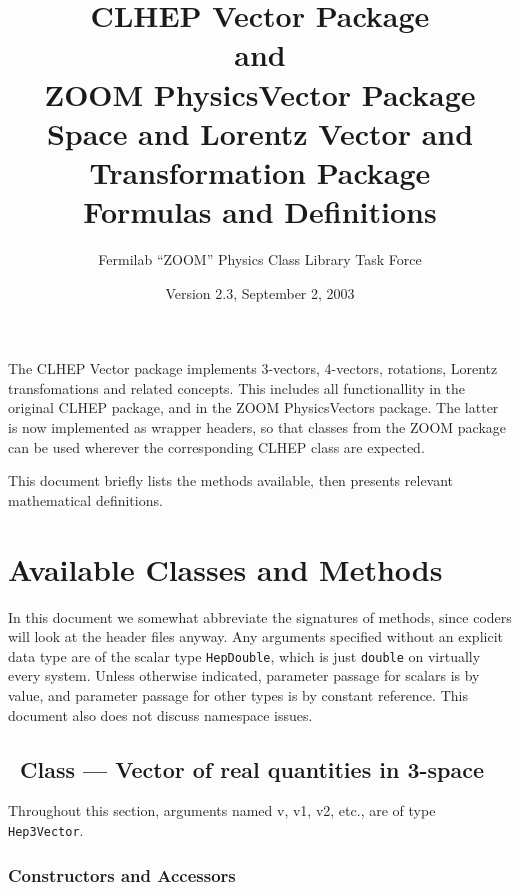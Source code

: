 \documentclass[twoside,12pt]{article}
\def \SV {{\tt Hep3Vector}}
\begin{document}
\title{CLHEP {\bf Vector} Package \\ 
and \\
ZOOM {\bf PhysicsVector} Package \\
Space and Lorentz Vector and Transformation Package \\
Formulas and Definitions}

\author{
Fermilab ``ZOOM'' Physics Class Library Task Force}
\date{Version 2.3, September 2, 2003}
\maketitle

The CLHEP Vector package implements 3-vectors, 4-vectors, rotations, 
Lorentz transfomations and related concepts.  
This includes all functionallity in the original CLHEP package, and in
the ZOOM PhysicsVectors package.  
The latter is now implemented as wrapper headers, so that classes from
the ZOOM package can be used wherever the corresponding CLHEP class are
expected.

This document briefly lists the methods available, then presents relevant
mathematical definitions. 

\tableofcontents

\section{Available Classes and Methods}

In this document we somewhat abbreviate the signatures of methods,
since coders will look at the header files anyway.  
Any arguments specified without an explicit data type
are of the scalar type {\tt HepDouble}, which is just {\tt double} on
virtually every system.
Unless otherwise indicated,
parameter passage for scalars is by value,
and parameter passage for other types is by constant reference.
This document also does not discuss namespace issues.

\subsection{\protect\SV\ Class --- Vector of real quantities in 3-space}

Throughout this section,
arguments named v, v1, v2, etc., are of type \SV .

\subsubsection{Constructors and Accessors}
\end{document}
